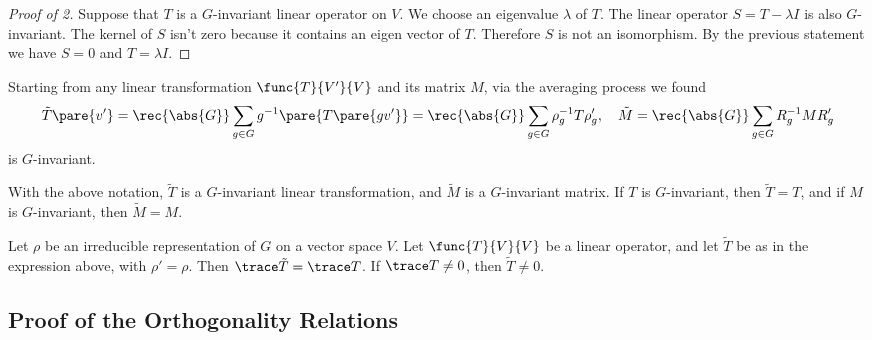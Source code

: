\documentclass[hidelinks]{article}
\begin{document}
\begin{proof}[Proof of 2]
    Suppose that $T$ is a $G$-invariant linear operator on $V$. We choose an eigenvalue $\lambda$ of $T$. The linear operator $S = T-\lambda I$ is also $G$-invariant. The kernel of $S$ isn't zero because it contains an eigen vector of $T$. Therefore $S$ is not an isomorphism. By the previous statement we have $S = 0$ and $T = \lambda I$.
\end{proof}
Starting from any linear transformation $\func{T}{V'}{V}$ and its matrix $M$, via the averaging process we found
\[ \tilde{T}\pare{v'} = \rec{\abs{G}}\sum_{g\in G} g^{-1}\pare{T\pare{gv'}} = \rec{\abs{G}}\sum_{g\in G}\rho_g^{-1}T\rho'_g,\quad \tilde{M} = \rec{\abs{G}}\sum_{g\in G}R_g^{-1}MR'_g \]
is $G$-invariant.
\begin{lemma}
    With the above notation, $\tilde{T}$ is a $G$-invariant linear transformation, and $\tilde{M}$ is a $G$-invariant matrix. If $T$ is $G$-invariant, then $\tilde{T} = T$, and if $M$ is $G$-invariant, then $\tilde{M} = M$.
\end{lemma}
\begin{proposition}
    Let $\rho$ be an irreducible representation of $G$ on a vector space $V$. Let $\func{T}{V}{V}$ be a linear operator, and let $\tilde{T}$ be as in the expression above, with $\rho' = \rho$. Then $\trace \tilde{T} = \trace T$. If $\trace T\neq 0$, then $\tilde{T} \neq 0$.
\end{proposition}


\subsection{Proof of the Orthogonality Relations} %
\label{sub:proof_of_the_orthogonality_relations}
\end{document}
